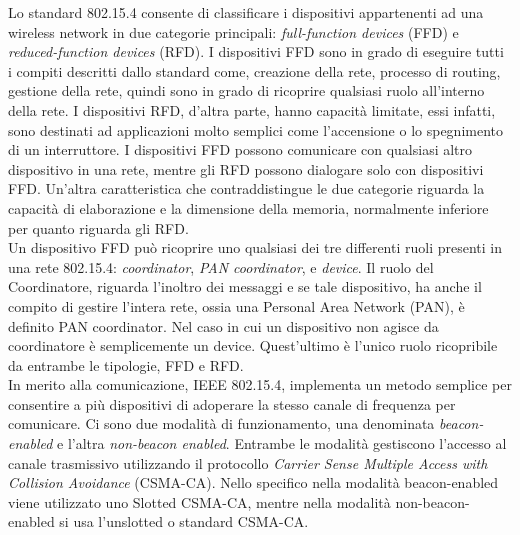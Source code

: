 \noindent Lo standard 802.15.4 consente di classificare i dispositivi appartenenti ad una wireless network in due categorie principali: \textit{full-function devices} (FFD) e \textit{reduced-function devices} (RFD). I dispositivi FFD sono in grado di eseguire tutti i compiti descritti dallo standard come, creazione della rete, processo di routing, gestione della rete, quindi sono in grado di ricoprire qualsiasi ruolo all'interno della rete. I dispositivi RFD, d'altra parte, hanno capacità limitate, essi infatti, sono destinati ad applicazioni molto semplici come l'accensione o lo spegnimento di un interruttore. I dispositivi FFD possono comunicare con qualsiasi altro dispositivo in una rete, mentre gli RFD possono dialogare solo con dispositivi FFD. Un'altra caratteristica che contraddistingue le due categorie riguarda la capacità di elaborazione e la dimensione della memoria, normalmente inferiore per quanto riguarda gli RFD.\\
Un dispositivo FFD può ricoprire uno qualsiasi dei tre differenti ruoli presenti in una rete 802.15.4: \textit{coordinator}, \textit{PAN coordinator}, e \textit{device}. Il ruolo del Coordinatore, riguarda l'inoltro dei messaggi e se tale dispositivo, ha anche il compito di gestire l'intera rete, ossia una Personal Area Network (PAN), è definito PAN coordinator. Nel caso in cui un dispositivo non agisce da coordinatore è semplicemente un device. Quest'ultimo è l'unico ruolo ricopribile da entrambe le tipologie, FFD e RFD.\\

\noindent In merito alla comunicazione, IEEE 802.15.4, implementa un metodo semplice per consentire a più dispositivi di adoperare la stesso canale di frequenza per comunicare. Ci sono due modalità di funzionamento, una denominata \textit{beacon-enabled} e l'altra \textit{non-beacon enabled}. Entrambe le modalità gestiscono l'accesso al canale trasmissivo utilizzando il protocollo \textit{Carrier Sense Multiple Access with Collision Avoidance} (CSMA-CA). Nello specifico nella modalità beacon-enabled viene utilizzato uno Slotted CSMA-CA, mentre nella modalità non-beacon-enabled si usa l'unslotted o standard CSMA-CA.\\

